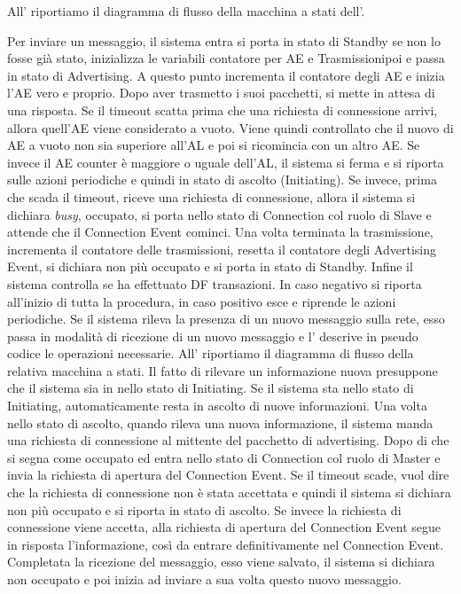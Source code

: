 All' riportiamo il diagramma di flusso della macchina a stati dell'.

Per inviare un messaggio, il sistema entra si porta in stato di Standby se non lo fosse già stato, inizializza le variabili contatore per \acf{AE} e Trasmissionipoi e passa in stato di Advertising. A questo punto incrementa il contatore degli \acl{AE} e inizia l'\acs{AE} vero e proprio. Dopo aver trasmetto i suoi pacchetti, si mette in attesa di una risposta. Se il timeout scatta prima che una richiesta di connessione arrivi, allora quell'AE viene considerato a vuoto. Viene quindi controllato che il nuovo di AE a vuoto non sia superiore all'AL e poi si ricomincia con un altro AE. Se invece il AE counter è maggiore o uguale dell'AL, il sistema si ferma e si riporta sulle azioni periodiche e quindi in stato di ascolto (Initiating). Se invece, prima che scada il timeout, riceve una richiesta di connessione, allora il sistema si dichiara \textit{busy}, occupato, si porta nello stato di Connection col ruolo di Slave e attende che il Connection Event cominci. Una volta terminata la trasmissione, incrementa il contatore delle trasmissioni, resetta il contatore degli Advertising Event, si dichiara non più occupato e si porta in stato di Standby. Infine il sistema controlla se ha effettuato DF transazioni. In caso negativo si riporta all'inizio di tutta la procedura, in caso positivo esce e riprende le azioni periodiche.
Se il sistema rileva la presenza di un nuovo messaggio sulla rete, esso passa in modalità di ricezione di un nuovo messaggio e l' descrive in pseudo codice le operazioni necessarie. All' riportiamo il diagramma di flusso della relativa macchina a stati. Il fatto di rilevare un informazione nuova presuppone che il sistema sia in nello stato di Initiating. Se il sistema sta nello stato di Initiating, automaticamente resta in ascolto di nuove informazioni. Una volta nello stato di ascolto, quando rileva una nuova informazione, il sistema manda una richiesta di connessione al mittente del pacchetto di advertising. Dopo di che si segna come occupato ed entra nello stato di Connection col ruolo di Master e invia la richiesta di apertura del Connection Event. Se il timeout scade, vuol dire che la richiesta di connessione non è stata accettata e quindi il sistema si dichiara non più occupato e si riporta in stato di ascolto. Se invece la richiesta di connessione viene accetta, alla richiesta di apertura del Connection Event segue in risposta l'informazione, così da entrare definitivamente nel Connection Event. Completata la ricezione del messaggio, esso viene salvato, il sistema si dichiara non occupato e poi inizia ad inviare a sua volta questo nuovo messaggio.
